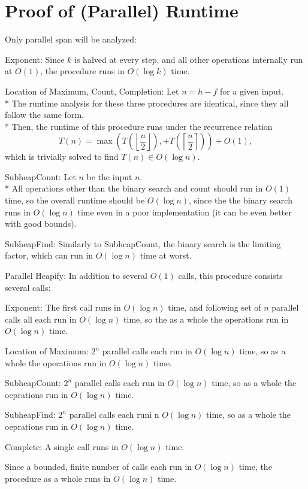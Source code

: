\documentclass[letterpaper, reqno, 11pt]{article}
\begin{document}
\section*{Proof of (Parallel) Runtime}
Only parallel span will be analyzed:
\begin{description}
	\item{Exponent:}
		Since $k$ is halved at every step, and all other operations internally run at $O(1)$,
		the procedure runs in $O(\log k)$ time.
	\item{Location of Maximum, Count, Completion:}
		Let $n=h-f$ for a given input.\\*
		The runtime analysis for these three procedures are identical,
		since they all follow the same form.\\*
		Then, the runtime of this procedure runs under the recurrence relation
		$$T(n)=\max\left(T\left(\left\lfloor\frac{n}{2}\right\rfloor\right),
		+T\left(\left\lceil\frac{n}{2}\right\rceil\right)\right)+O(1),$$
		which is trivially solved to find $T(n)\in O(\log n)$.
	\item{SubheapCount:}
		Let $n$ be the input $n$.\\*
		All operations other than the binary search and count should run in $O(1)$ time,
		so the overall runtime should be $O(\log n)$,
		since the the binary search runs in $O(\log n)$ time even in a poor implementation
		(it can be even better with good bounds).
	\item{SubheapFind:}
		Similarly to SubheapCount, the binary search is the limiting factor,
		which can run in $O(\log n)$ time at worst.
	\item{Parallel Heapify:}
		In addition to several $O(1)$ calls, this procedure consists several calls:
		\begin{description}
			\item{Exponent:} The first call runs in $O(\log n)$ time,
			and following set of $n$ parallel calls all each run in $O(\log n)$ time,
			so the as a whole the operations run in $O(\log n)$ time.
			\item{Location of Maximum:} $2^n$ parallel calls each run in $O(\log n)$ time,
			so as a whole the operations run in $O(\log n)$ time.
			\item{SubheapCount:} $2^n$ parallel calls each run in $O(\log n)$ time,
			so as a whole the oeprations run in $O(\log n)$ time.
			\item{SubheapFind:} $2^n$ parallel calls each runi n $O(\log n)$ time,
			so as a whole the oeprations run in $O(\log n)$ time.
			\item{Complete:} A single call runs in $O(\log n)$ time.
		\end{description}
		Since a bounded, finite number of calls each run in $O(\log n)$ time,
		the procedure as a whole runs in $O(\log n)$ time.
\end{description}
\end{document}
